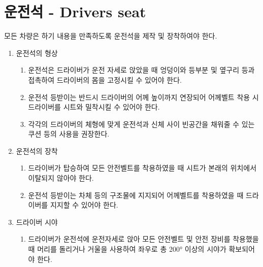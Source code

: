 \documentclass[final,a4paper,10pt]{report}
\begin{document}
{\color{blue}
\section{운전석 - Drivers seat}\label{rule:formula-technical.cockpit} \label{section:운전석}

모든 차량은 하기 내용을 만족하도록 운전석을 제작 및 장착하여야 한다.

\begin{enumerate}
  \item\label{rule:formula-technical.cockpit.seat-shape} 운전석의 형상
    \begin{enumerate}
      \item\label{rule:formula-technical.cockpit.seat-shape.torso-containment} 운전석은 드라이버가 운전 자세로 앉았을 때 엉덩이와 등부분 및 옆구리 등과 접촉하여 드라이버의 몸을 고정시킬 수 있어야 한다.
      \item\label{rule:formula-technical.cockpit.seat-shape.backrest-shoulder-height} 운전석 등받이는 반드시 드라이버의 어께 높이까지 연장되어 어께벨트 착용 시 드라이버를 시트와 밀착시킬 수 있어야 한다.
      \item\label{rule:formula-technical.cockpit.seat-shape.gap-filling-cushions} 각각의 드라이버의 체형에 맞게 운전석과 신체 사이 빈공간을 채워줄 수 있는 쿠션 등의 사용을 권장한다.
    \end{enumerate}
  \item\label{rule:formula-technical.cockpit.seat-mounting} 운전석의 장착
    \begin{enumerate}
      \item\label{rule:formula-technical.cockpit.seat-mounting.seat-position-retention} 드라이버가 탑승하여 모든 안전벨트를 착용하였을 때 시트가 본래의 위치에서 이탈되지 않아야 한다.
      \item\label{rule:formula-technical.cockpit.seat-mounting.backrest-structural-support} 운전석 등받이는 차체 등의 구조물에 지지되어 어께벨트를 착용하였을 때 드라이버를 지지할 수 있어야 한다.
    \end{enumerate}
  \item\label{rule:formula-technical.cockpit.visibility} 드라이버 시야
    \begin{enumerate}
      \item\label{rule:formula-technical.cockpit.visibility.fov-200deg} 드라이버가 운전석에 운전자세로 앉아 모든 안전벨트 및 안전 장비를 착용했을 때 머리를 돌리거나 거울을 사용하여 좌우로 총 200° 이상의 시야가 확보되어야 한다.
    \end{enumerate}
  \end{enumerate}
}
\end{document}
